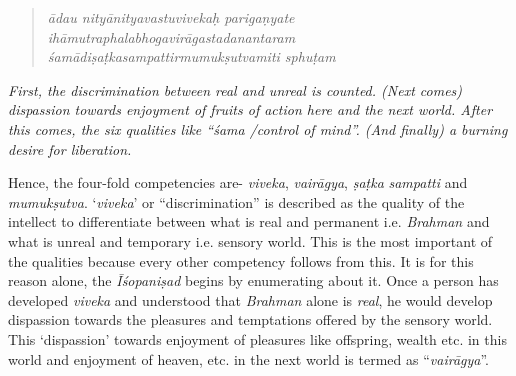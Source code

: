 \begin{verse}
\emph{ādau nityānityavastuvivekaḥ parigaṇyate }\\
\emph{ihāmutraphalabhogavirāgastadanantaram }\\
\emph{śamādiṣaṭkasampattirmumukṣutvamiti sphuṭam }
\end{verse}

\emph{First, the discrimination between real and unreal is counted. (Next comes) dispassion towards enjoyment of fruits of action here and the next world. After this comes, the six qualities like ``śama /control of mind''. (And finally) a burning desire for liberation.}

Hence, the four-fold competencies are- \emph{viveka}, \emph{vairāgya}, \emph{ṣaṭka} \emph{sampatti} and \emph{mumukṣutva}. `\emph{viveka}' or ``discrimination'' is described as the quality of the intellect to differentiate between what is real and permanent i.e. \emph{Brahman} and what is unreal and temporary i.e. sensory world. This is the most important of the qualities because every other competency follows from this. It is for this reason alone, the \emph{Īśopaniṣad} begins by enumerating about it. Once a person has developed \emph{viveka} and understood that \emph{Brahman} alone is \emph{real}, he would develop dispassion towards the pleasures and temptations offered by the sensory world. This `dispassion' towards enjoyment of pleasures like offspring, wealth etc. in this world and enjoyment of heaven, etc. in the next world is termed as ``\emph{vairāgya}''.

